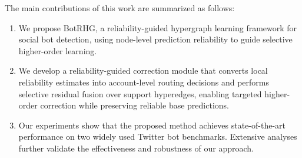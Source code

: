 The main contributions of this work are summarized as follows:
\begin{enumerate}
\item We propose BotRHG, a reliability-guided hypergraph learning framework for social bot detection, using node-level prediction reliability to guide selective higher-order learning.
\item We develop a reliability-guided correction module that converts local reliability estimates into account-level routing decisions and performs selective residual fusion over support hyperedges, enabling targeted higher-order correction while preserving reliable base predictions.
\item Our experiments show that the proposed method achieves state-of-the-art performance on two widely used Twitter bot benchmarks. Extensive analyses further validate the effectiveness and robustness of our approach.
\end{enumerate}

